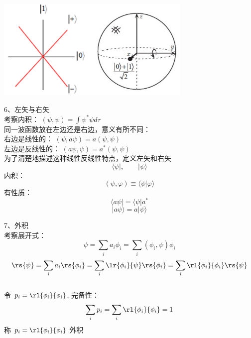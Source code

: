 \begin{frame} 
    \begin{center}
        \includegraphics[width=0.7\textwidth]{figs/26.png}
    \end{center} 
\end{frame}


\begin{frame}{}
    6、左矢与右矢\\
    考察内积： $(\psi,\psi)=\int\psi^*\psi d\tau$ \\
    同一波函数放在左边还是右边，意义有所不同： \\
    右边是线性的：  $(\psi,a\psi)=a (\psi,\psi)$ \\
    左边是反线性的：   $(a\psi,\psi)=a^* (\psi,\psi)$  \\
    为了清楚地描述这种线性反线性特点，定义左矢和右矢
    $$\langle \psi |, \qquad |\psi \rangle $$ 
    内积：\[(\psi,\varphi)\equiv \langle \psi | \varphi \rangle\]
    有性质： $$\langle a\psi | = \langle \psi |a^* $$
    $$ |a\psi \rangle = a|\psi \rangle$$ 
\end{frame}

\begin{frame}{}
    7、外积\\
    考察展开式： \[\psi=\sum_i a_i \phi_i= \sum_i (\phi_i,\psi) \phi_i\]
    \[\rs{\psi}=\sum_i a_i \rs{\phi_i}= \sum_i \lr{\phi_i}{\psi} \rs{\phi_i} =\sum_i \rl{\phi_i}{\phi_i} \rs{\psi}\]
    ~~\\
    令 $p_i= \rl{\phi_i}{\phi_i} $, 完备性：
    \[\sum_i p_i= \sum_i \rl{\phi_i}{\phi_i}=1 \]
    称  $p_i= \rl{\phi_i}{\phi_i} $ 外积
\end{frame}

